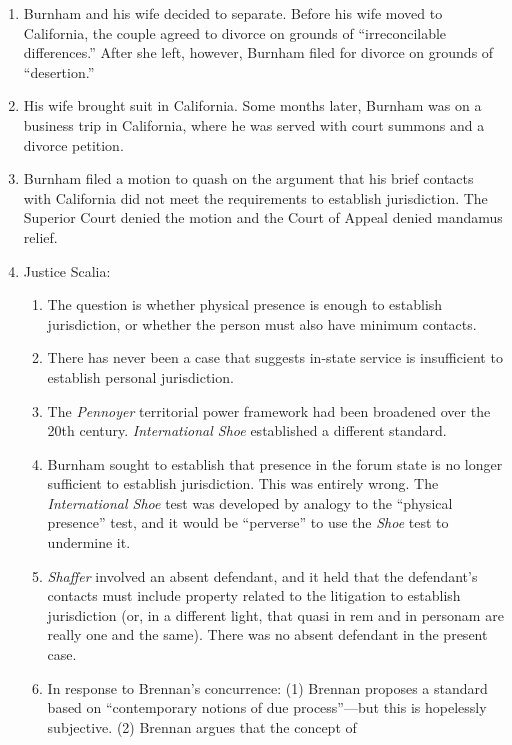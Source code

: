 \begin{enumerate}
    \item Burnham and his wife decided to separate. Before his wife moved to 
    California, the couple agreed to divorce on grounds of ``irreconcilable 
    differences.'' After she left, however, Burnham filed for divorce on 
    grounds of ``desertion.''
    \item His wife brought suit in California. Some months later, Burnham was 
    on a business trip in California, where he was served with court summons 
    and a divorce petition.
    \item Burnham filed a motion to quash on the argument that his brief 
    contacts with California did not meet the requirements to establish 
    jurisdiction. The Superior Court denied the motion and the Court of Appeal 
    denied mandamus relief.
    \item Justice Scalia:
    \begin{enumerate}
        \item The question is whether physical presence is enough to establish 
        jurisdiction, or whether the person must also have minimum contacts.
        \item There has never been a case that suggests in-state service is 
        insufficient to establish personal jurisdiction.
        \item The \emph{Pennoyer} territorial power framework had been 
        broadened over the 20th century. \emph{International Shoe} established 
        a different standard.
        \item Burnham sought to establish that presence in the forum state is no 
        longer sufficient to establish jurisdiction. This was entirely wrong. 
        The \emph{International Shoe} test was developed by analogy to the 
        ``physical presence'' test, and it would be ``perverse'' to use the 
        \emph{Shoe} test to undermine it.
        \item \emph{Shaffer} involved an absent defendant, and it held that 
        the defendant's contacts must include property related to the 
        litigation to establish jurisdiction (or, in a different light, that 
        quasi in rem and in personam are really one and the same). There was 
        no absent defendant in the present case.
        \item In response to Brennan's concurrence: (1) Brennan proposes a 
        standard based on ``contemporary notions of due process''---but this 
        is hopelessly subjective. (2) Brennan argues that the concept of 

\end{enumerate}
\end{enumerate}
